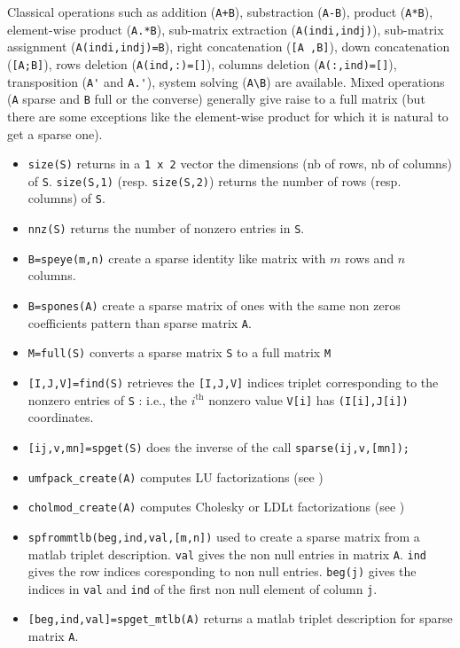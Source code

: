 
Classical operations such as addition (\verb-A+B-), substraction  (\verb+A-B+), product (\verb+A*B+), 
element-wise product (\verb+A.*B+), sub-matrix extraction (\verb+A(indi,indj)+), 
sub-matrix assignment (\verb+A(indi,indj)=B+), right concatenation  (\verb+[A ,B]+), 
down concatenation  (\verb+[A;B]+),  rows deletion (\verb+A(ind,:)=[]+), columns deletion (\verb+A(:,ind)=[]+), 
transposition (\verb+A'+ and \verb+A.'+),  system solving (\verb+A\B+) are available. 
Mixed operations (\verb+A+ sparse and \verb+B+ full or the converse) generally give raise to a 
full matrix (but there are some exceptions like the element-wise product for which it is natural 
to get a sparse one). 

\begin{itemize}
   \item \verb+size(S)+ returns in a \verb+1 x 2+ vector the dimensions (nb of rows, nb of columns)
of \verb+S+. \verb+size(S,1)+ (resp. \verb+size(S,2)+) returns the number of rows 
(resp. columns) of \verb+S+.
    \item \verb+nnz(S)+ returns the number of nonzero entries in \verb+S+.
    \item \verb+B=speye(m,n)+ create a sparse identity like matrix with $m$ rows and $n$ columns. 
    \item \verb+B=spones(A)+ create a sparse matrix of ones with the same non zeros coefficients pattern than sparse matrix \verb+A+. 
    \item \verb+M=full(S)+ converts a sparse matrix \verb+S+ to a full matrix \verb+M+ 
    \item \verb+[I,J,V]=find(S)+ retrieves the \verb+[I,J,V]+ indices triplet 
corresponding to the nonzero entries of \verb+S+ : i.e., the $i^{\mbox{th}}$ nonzero
value \verb+V[i]+ has \verb+(I[i],J[i])+ coordinates.
    \item \verb+[ij,v,mn]=spget(S)+ does the inverse of the call \verb+sparse(ij,v,[mn]);+ 
    \item \verb+umfpack_create(A)+ computes LU factorizations (see )
    \item \verb+cholmod_create(A)+ computes Cholesky or LDLt factorizations (see
      ) 
    \item \verb+spfrommtlb(beg,ind,val,[m,n])+ used to create a sparse matrix from a matlab triplet description. 
      \verb+val+ gives the non null entries in matrix \verb+A+. \verb+ind+ gives the row indices coresponding to non 
      null entries. \verb+beg(j)+ gives the indices in \verb+val+ and \verb+ind+ of the first non null element of column \verb+j+.
    \item \verb+[beg,ind,val]=spget_mtlb(A)+ returns a matlab triplet description for sparse matrix \verb+A+.
\end{itemize}

